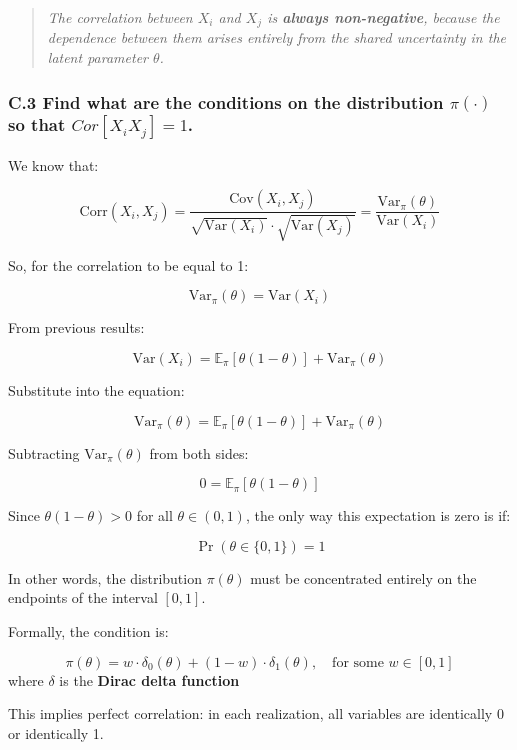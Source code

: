 \documentclass[
]{article}
\begin{document}
\begin{quote}
\emph{The correlation between \(X_i\) and \(X_j\) is \textbf{always
non-negative}, because the dependence between them arises entirely from
the shared uncertainty in the latent parameter \(\theta\).}
\end{quote}

\subsubsection{\texorpdfstring{C.3 Find what are the conditions on the
distribution \(\pi(\cdot)\) so that
\(Cor[X_i X_j]=1\).}{C.3 Find what are the conditions on the distribution \textbackslash pi(\textbackslash cdot) so that Cor{[}X\_i X\_j{]}=1.}}\label{c.3-find-what-are-the-conditions-on-the-distribution-picdot-so-that-corx_i-x_j1.}

We know that:

\[
\text{Corr}(X_i, X_j) = \frac{\text{Cov}(X_i, X_j)}{\sqrt{\text{Var}(X_i)} \cdot \sqrt{\text{Var}(X_j)}} = \frac{\text{Var}_\pi(\theta)}{\text{Var}(X_i)}
\]

So, for the correlation to be equal to 1:

\[
\text{Var}_\pi(\theta) = \text{Var}(X_i)
\]

From previous results:

\[
\text{Var}(X_i) = \mathbb{E}_\pi[\theta(1 - \theta)] + \text{Var}_\pi(\theta)
\]

Substitute into the equation:

\[
\text{Var}_\pi(\theta) = \mathbb{E}_\pi[\theta(1 - \theta)] + \text{Var}_\pi(\theta)
\]

Subtracting \(\text{Var}_\pi(\theta)\) from both sides:

\[
0 = \mathbb{E}_\pi[\theta(1 - \theta)]
\]

Since \(\theta(1 - \theta) > 0\) for all \(\theta \in (0, 1)\), the only
way this expectation is zero is if:

\[
\Pr(\theta \in \{0, 1\}) = 1
\]

In other words, the distribution \(\pi(\theta)\) must be concentrated
entirely on the endpoints of the interval \([0, 1]\).

Formally, the condition is:

\[
\pi(\theta) = w \cdot \delta_0(\theta) + (1 - w) \cdot \delta_1(\theta), \quad \text{for some } w \in [0, 1]
\] where \(\delta\) is the \textbf{Dirac delta function}

This implies perfect correlation: in each realization, all variables are
identically 0 or identically 1.
\end{document}
